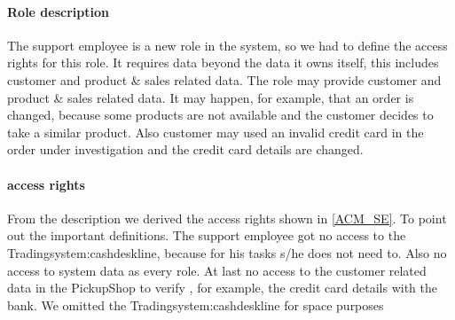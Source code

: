 \paragraph{Role description}
The support employee is a new role in the system, so we had to define the access rights for this role. It requires data beyond the data it owns itself, this includes customer and product \& sales related data. The role may provide customer and product \& sales related data. It may happen, for example, that an order is changed, because some products are not available and the customer decides to take a similar product. Also customer may used an invalid credit card in the order under investigation and the credit card details are changed.
\paragraph{access rights}
From the description we derived the access rights shown in \autoref{ACM_SE}. To point out the important definitions. The support employee got no access to the Tradingsystem:cashdeskline, because for his tasks s/he does not need to. Also no access to system data as every role. At last no access to the customer related data in the PickupShop to verify , for example, the credit card details with the bank. We omitted the Tradingsystem:cashdeskline for space purposes 
